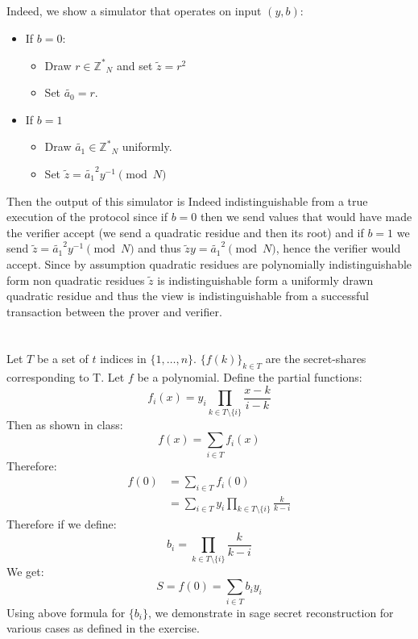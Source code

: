 \documentclass{article}
\begin{document}
\subsection{}%
Indeed, we show a simulator that operates on input $(y,b)$:
\begin{itemize}
\item If $b = 0$:
\begin{itemize}
\item Draw $r\in \mathbb{Z^*}_{N}$ and set $\tilde{z} = r^2$
\item Set $\tilde{a_0} = r$.
\end{itemize}
\item If $b=1$
\begin{itemize}
\item Draw $\tilde{a_1} \in \mathbb{Z^*}_{N}$ uniformly.
\item Set  $\tilde{z} = \tilde{a_1}^2 y^{-1} \pmod{N}$
\end{itemize}
\end{itemize}
Then the output of this simulator is Indeed indistinguishable from a true execution of the protocol since if $b=0$ then we send values that would have made the verifier accept (we send a quadratic residue and then its root) and if $b=1$ we send $\tilde{z} = \tilde{a_1}^2 y^{-1} \pmod{N}$ and thus $\tilde{z}y = \tilde{a_1}^2  \pmod{N}$, hence the verifier would accept. Since by assumption quadratic residues are polynomially indistinguishable form non quadratic residues $\tilde{z}$ is indistinguishable form a uniformly drawn quadratic residue and thus the view is indistinguishable from a successful transaction between the prover and verifier.

\pagebreak
\section{}%
Let $T$ be a set of $t$ indices in $\{1,\ldots,n\}$. $\{f(k)\}_{k \in T}$ are the secret-shares corresponding to T. Let $f$ be a polynomial. 
Define the partial functions: \[
f_i(x)=y_i \prod_{k \in T \setminus \{i\}} \frac{x - k}{i - k}
\]
Then as shown in class: \[
f(x) = \sum_{i \in T} f_i(x)
\]
Therefore: \begin{align*}
f(0) &= \sum_{i \in T} f_i(0) \\
     &= \sum_{i \in T} y_i \prod_{k \in T \setminus \{i\}} \frac{k}{k - i}
\end{align*}
Therefore if we define: \[
b_i = \prod_{k \in T \setminus \{i\}} \frac{k}{k - i}
\]
We get: \[
S = f(0) = \sum_{i \in T} b_i y_i
\]
Using above formula for $\{b_i\}$, we demonstrate in sage secret reconstruction for various cases as defined in the exercise.
\end{document}
